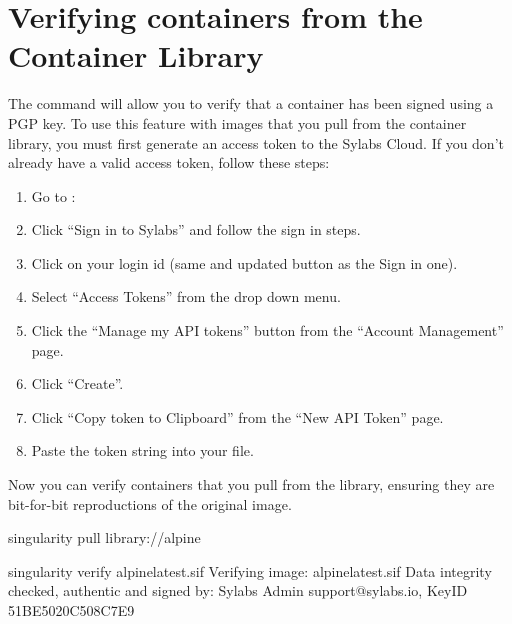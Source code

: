 \documentclass[letterpaper,10pt,english]{sphinxmanual}
\begin{document}
\section{Verifying containers from the Container Library}
\label{\detokenize{signNverify:verifying-containers-from-the-container-library}}
The  command will allow you to verify that a container has been
signed using a PGP key. To use this feature with images that you pull from the
container library, you must first generate an access token to the Sylabs Cloud.
If you don’t already have a valid access token, follow these steps:
\begin{enumerate}
\item {} 
Go to : 

\item {} 
Click “Sign in to Sylabs” and follow the sign in steps.

\item {} 
Click on your login id (same and updated button as the Sign in one).

\item {} 
Select “Access Tokens” from the drop down menu.

\item {} 
Click the “Manage my API tokens” button from the “Account Management” page.

\item {} 
Click “Create”.

\item {} 
Click “Copy token to Clipboard” from the “New API Token” page.

\item {} 
Paste the token string into your  file.

\end{enumerate}

Now you can verify containers that you pull from the library, ensuring they are
bit-for-bit reproductions of the original image.

%
\begin{sphinxVerbatim}[commandchars=\\\{\}]
\PYGZdl{} singularity pull library://alpine

\PYGZdl{} singularity verify alpine\PYGZus{}latest.sif
Verifying image: alpine\PYGZus{}latest.sif
Data integrity checked, authentic and signed by:
    Sylabs Admin \PYGZlt{}support@sylabs.io\PYGZgt{}, KeyID 51BE5020C508C7E9
\end{sphinxVerbatim}
\end{document}
